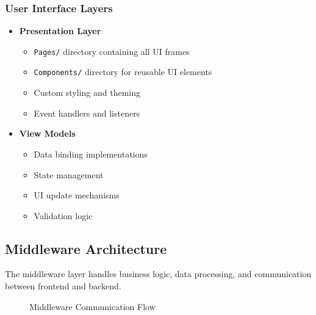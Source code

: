 \documentclass[12pt,a4paper]{article}
\begin{document}
\subsubsection{User Interface Layers}
\begin{itemize}
    \item \textbf{Presentation Layer}
    \begin{itemize}
        \item \texttt{Pages/} directory containing all UI frames
        \item \texttt{Components/} directory for reusable UI elements
        \item Custom styling and theming
        \item Event handlers and listeners
    \end{itemize}
    
    \item \textbf{View Models}
    \begin{itemize}
        \item Data binding implementations
        \item State management
        \item UI update mechanisms
        \item Validation logic
    \end{itemize}
\end{itemize}

\subsection{Middleware Architecture}
The middleware layer handles business logic, data processing, and communication between frontend and backend.

\begin{figure}[h]
\centering
{}
\caption{Middleware Communication Flow}
\end{figure}
\end{document}
